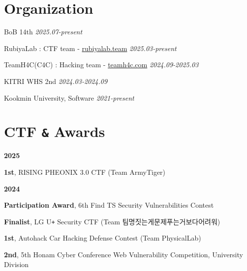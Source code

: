 \documentclass[margin,line]{resume}
\begin{document}
\begin{resume}
 	

 	    \section{\mysidestyle Organization}%
 	      \begin{list2}
            \item{BoB 14th \hfill \textsl{2025.07-present}}
 	          \item{RubiyaLab : CTF team - \href{https://rubiyalab.team}{rubiyalab.team} \hfill \textsl{2025.03-present}}
            \item{TeamH4C(C4C) : Hacking team - \href{https://teamh4c.com}{teamh4c.com} \hfill \textsl{2024.09-2025.03}}
 	          \item{KITRI WHS 2nd  \hfill \textsl{2024.03-2024.09}}
 	          \item{Kookmin University, Software  \hfill \textsl{2021-present}}
 	      
 	      \end{list2}


        \section{\mysidestyle CTF \texttt{\&} Awards}
      
        \textbf{2025}
        \vspace{1mm}
        \begin{list2}
          \item \textbf{1st}, RISING PHEONIX 3.0 CTF (Team ArmyTiger)
        \end{list2}
        
        \textbf{2024}
        \vspace{1mm}
        \begin{list2}
          \item \textbf{Participation Award}, 6th Find TS Security Vulnerabilities Contest
          \item \textbf{Finalist}, LG U\texttt{+} Security CTF (Team 팀명짓는게문제푸는거보다어려워)
          \item \textbf{1st}, Autohack Car Hacking Defense Contest (Team PhysicalLab)
          \item \textbf{2nd}, 5th Honam Cyber Conference Web Vulnerability Competition, University Division
        \end{list2}


\end{resume}
\end{document}
